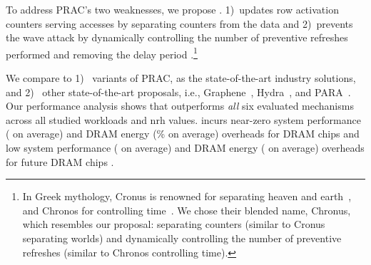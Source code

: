 To address PRAC’s two  weaknesses, we propose \X{}.
\X{} 1)~updates row activation counters   serving accesses by  separating counters from the data and
2)~prevents the wave attack by dynamically controlling the number of preventive refreshes performed  and removing the delay period .\footnote{In Greek mythology, Cronus is renowned for separating heaven and earth~\cite{graf1993greek}, and Chronos for controlling time~\cite{graf1993greek}. We chose their blended name, Chronus, which resembles our proposal: separating counters (similar to Cronus separating worlds) and dynamically controlling the number of preventive refreshes (similar to Chronos controlling time).}

We compare \X{} to 1)~ variants of PRAC, as the state-of-the-art industry solutions, and 2)~ other state-of-the-art  proposals, i.e., Graphene~\cite{park2020graphene}, Hydra~\cite{qureshi2022hydra}, and PARA~\cite{kim2014flipping}.
Our performance analysis shows that \X{} outperforms \emph{all} six evaluated mechanisms across all studied workloads and \gls{nrh} values.
\X{} incurs near-zero system performance ( on average) and  DRAM energy (\% on average) overheads for  DRAM chips  and low system performance ( on average) and DRAM energy ( on average) overheads for future DRAM chips .

